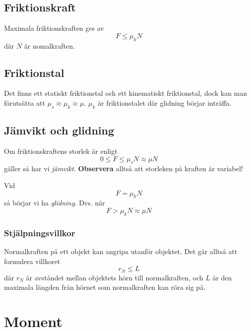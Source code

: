 \documentclass{article}
\newenvironment{ankiflashcard}[1][ ]{}{}
\begin{document}
\begin{paracol}{2}
\begin{ankiflashcard}
\subsection{Friktionskraft}
Maximala friktionskraften ges av
$$
F \leq \mu_k N
$$
där $N$ är nomalkraften.
\subsection{Friktionstal}
Det finns ett statiskt friktionstal och ett kinematiskt friktionstal, dock kan man förutsätta att $\mu_s \approx \mu_k \approx \mu$. $\mu_k$ är friktionstalet där glidning börjar inträffa.
\end{ankiflashcard}

\begin{ankiflashcard}
\subsection{Jämvikt och glidning}
Om friktionskraftens storlek är enligt
$$
0\leq F \leq \mu_s N \approx \mu N
$$
gäller så har vi \textit{jämvikt}. \textbf{Observera} alltså att storleken på kraften är variabel!
\end{ankiflashcard}

\begin{ankiflashcard}
Vid $$F=\mu_kN$$ så börjar vi ha \textit{glidning}. Dvs. när
$$
F > \mu_k N \approx \mu N
$$
\end{ankiflashcard}

\begin{ankiflashcard}
\subsubsection{Stjälpningsvillkor}
Normalkraften på ett objekt kan angripa utanför objektet. Det går alltså att formulera villkoret 
$$r_N\leq L$$
där $r_N$ är avståndet mellan objektets hörn till normalkraften, och $L$ är den maximala längden från hörnet som normalkraften kan röra sig på.
\end{ankiflashcard}
\switchcolumn

\begin{ankiflashcard}
\section{Moment}

\end{ankiflashcard}
\end{paracol}
\end{document}
